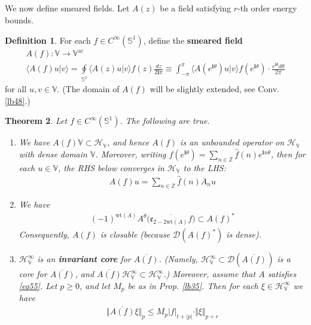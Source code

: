 \documentclass[12pt,b5paper,notitlepage]{article}
\theoremstyle{definition}
\newtheorem{df}{Definition}[section]
\theoremstyle{plain}
\newtheorem{thm}[df]{Theorem}
\newcommand{\wht}{\widehat}
\newcommand{\ovl}{\overline}
\newcommand{\Dom}{\scr{D}}
\newcommand{\bk}[1]{\langle {#1}\rangle}
\newcommand{\scr}{\mathscr}
\newcommand{\im}{\mathbf{i}}
\newcommand{\Vbb}{\mathbb V}
\newcommand{\Zbb}{\mathbb Z}
\newcommand{\wt}{\mathrm{wt}}
\newcommand{\Sbb}{{\mathbb S}}
\newcommand{\HV}{\mathcal H_{\mathbb V}}
\newcommand{\ek}{\mathfrak{e}}
\newcommand{\ac}{\mathrm{ac}}
\numberwithin{equation}{section}
\begin{document}
\subsection{}

We now define smeared fields. Let $A(z)$ be a field satisfying $r$-th order energy bounds.

\begin{df}\label{lb38}
For each $f\in C^\infty(\Sbb^1)$, define the \textbf{smeared field} 
\begin{gather*}
A(f):\Vbb\rightarrow\Vbb^\ac\\
\bk{A(f)u|v}=\oint\limits_{\Sbb^1} \bk{A(z)u|v}f(z)\frac{dz}{2\im\pi}\equiv \int_{-\pi}^\pi \bk{A(e^{\im \theta})u|v}f(e^{\im \theta})\cdot \frac{e^{\im\theta}d\theta}{2\pi}
\end{gather*} 
for all $u,v\in\Vbb$. (The domain of $A(f)$ will be slightly extended, see Conv. \ref{lb48}.)
\end{df}








\begin{thm}\label{lb39}
Let $f\in C^\infty(\Sbb^1)$. The following are true.
\begin{enumerate}[label=(\alph*)]
\item We have $A(f)\Vbb\subset\HV$, and hence $A(f)$ is an unbounded operator on $\HV$ with dense domain $\Vbb$. Moreover, writing $f(e^{\im\theta})=\sum_{n\in\Zbb}\wht f(n)e^{\im n\theta}$, then for each $u\in\Vbb$, the RHS below converges in $\HV$ to the LHS:
\begin{align}\label{eq59}
A(f)u=\sum_{n\in\Zbb}\wht f(n) A_nu
\end{align}
\item We have
\begin{align}\label{eq62}
(-1)^{\wt(A)}A^\theta\big(\ovl{\ek_{2-2\wt(A)}f}\big)\subset A(f)^*
\end{align}
Consequently, $A(f)$ is closable (because $\Dom(A(f)^*)$ is dense).
\item $\HV^\infty$ is an \textbf{invariant core}  for $\ovl{A(f)}$. (Namely, $\HV^\infty\subset \Dom(\ovl{A(f)})$ is a core for $\ovl{A(f)}$, and $\ovl{A(f)}\HV^\infty\subset\HV^\infty$.) Moreover, assume that $A$ satisfies \eqref{eq55}. Let $p\geq0$, and let $M_p$ be as in Prop. \ref{lb35}. Then for each $\xi\in\HV^\infty$  we have
\begin{align}\label{eq63}
\Vert \ovl{A(f)}\xi\Vert_p\leq M_p|f|_{t+|p|}\cdot \Vert \xi\Vert_{p+r}
\end{align}
\end{enumerate}
\end{thm}
\end{document}
